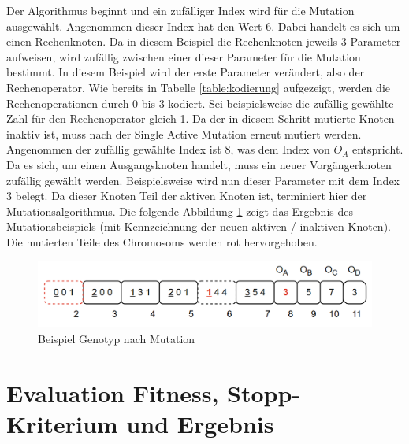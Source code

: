Der Algorithmus beginnt und ein zufälliger Index wird für die Mutation ausgewählt.
Angenommen dieser Index hat den Wert 6.
Dabei handelt es sich um einen Rechenknoten.
Da in diesem Beispiel die Rechenknoten jeweils 3 Parameter aufweisen, wird zufällig zwischen einer dieser Parameter für die Mutation bestimmt.
In diesem Beispiel wird der erste Parameter verändert, also der Rechenoperator.
Wie bereits in Tabelle \ref{table:kodierung} aufgezeigt, werden die Rechenoperationen durch 0 bis 3 kodiert.
Sei beispielsweise die zufällig gewählte Zahl für den Rechenoperator gleich 1.
Da der in diesem Schritt mutierte Knoten inaktiv ist, muss nach der Single Active Mutation erneut mutiert werden.\\
Angenommen der zufällig gewählte Index ist 8, was dem Index von $O_A$ entspricht.
Da es sich, um einen Ausgangsknoten handelt, muss ein neuer Vorgängerknoten zufällig gewählt werden.
Beispielsweise wird nun dieser Parameter mit dem Index 3 belegt.
Da dieser Knoten Teil der aktiven Knoten ist, terminiert hier der Mutationsalgorithmus.
Die folgende Abbildung \ref{fig:genotypNachMutation} zeigt das Ergebnis des Mutationsbeispiels (mit Kennzeichnung der neuen aktiven / inaktiven Knoten).
Die mutierten Teile des Chromosoms werden rot hervorgehoben.

\begin{figure}[H]
	\centering
	\includegraphics[scale = 0.5]{Bilder/GenotypNachMutation.png}
	\caption{Beispiel Genotyp nach Mutation}
	\label{fig:genotypNachMutation}
\end{figure}


\section{Evaluation Fitness, Stopp-Kriterium und Ergebnis}
\label{sec:fitness,StopKrit,Ergebnis}

